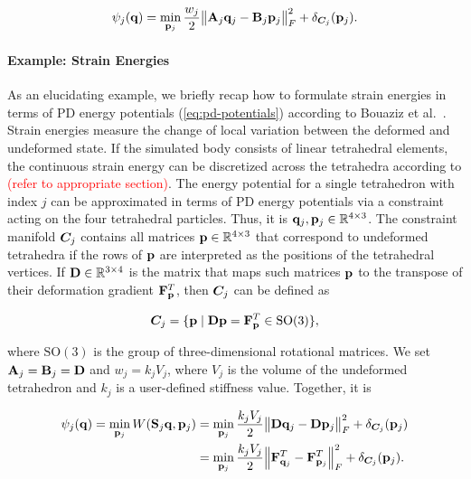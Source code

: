 \begin{equation}\label{eq:pd-potentials}
    \psi_j(\mathbf{q}) = \min_{\mathbf{p}_j} \frac{w_j}{2} \norm{\mathbf{A}_j\mathbf{q}_j - \mathbf{B}_j\mathbf{p}_j}^2_F + \delta_{\bm{C}_j}(\mathbf{p}_j).
\end{equation}

\paragraph{Example: Strain Energies} 
As an elucidating example, we briefly recap how to formulate strain energies in terms of PD energy potentials 
(\autoref{eq:pd-potentials}) according to Bouaziz et al.\ \cite{bouaziz2014}. Strain energies measure the change of local variation between 
the deformed and undeformed state. If the simulated body consists of linear tetrahedral elements, the continuous strain energy can be 
discretized across the tetrahedra according to \textcolor{red}{(refer to appropriate section)}. The energy potential for a single tetrahedron
with index $j$ can be approximated in terms of PD energy potentials via a constraint acting on the four tetrahedral particles. Thus, it is
$\mathbf{q}_j, \mathbf{p}_j \in \mathbb{R}^{4 \times 3}$. The constraint manifold $\bm{C}_j$ contains all matrices $\mathbf{p} \in 
\mathbb{R}^{4 \times 3}$ that correspond to undeformed tetrahedra if the rows of $\mathbf{p}$ are interpreted as the positions of the tetrahedral
vertices. If $\mathbf{D} \in \mathbb{R}^{3 \times 4}$ is the matrix that maps such matrices $\mathbf{p}$ to the transpose of their deformation 
gradient $\mathbf{F}_\mathbf{p}^T$, then $\bm{C}_j$ can be defined as

\begin{equation}\label{eq:pd-strain-constraint}
    \bm{C}_j = \{ \mathbf{p} \mid \mathbf{D}\mathbf{p} = \mathbf{F}_\mathbf{p}^T \in \text{SO}(3) \},
\end{equation}

\noindent where $\text{SO}(3)$ is the group of three-dimensional rotational matrices. We set $\mathbf{A}_j = \mathbf{B}_j 
= \mathbf{D}$ and $w_j = k_jV_j$, where $V_j$ is the volume of the undeformed tetrahedron and $k_j$ is a user-defined 
stiffness value. Together, it is

\begin{align}
    \begin{split}\label{eq:pd-strain}    
    \psi_j(\mathbf{q}) 
    = \min_{\mathbf{p}_j} W(\mathbf{S}_j\mathbf{q}, \mathbf{p}_j) 
    &= \min_{\mathbf{p}_j} \frac{k_jV_j}{2} \norm{\mathbf{D}\mathbf{q}_j - \mathbf{D}\mathbf{p}_j}^2_F + \delta_{\bm{C}_j}(\mathbf{p}_j) \\
    &= \min_{\mathbf{p}_j} \frac{k_jV_j}{2} \norm{\mathbf{F}_{\mathbf{q}_j}^T - \mathbf{F}_{\mathbf{p}_j}^T}^2_F + \delta_{\bm{C}_j}(\mathbf{p}_j).
    \end{split}
\end{align}

